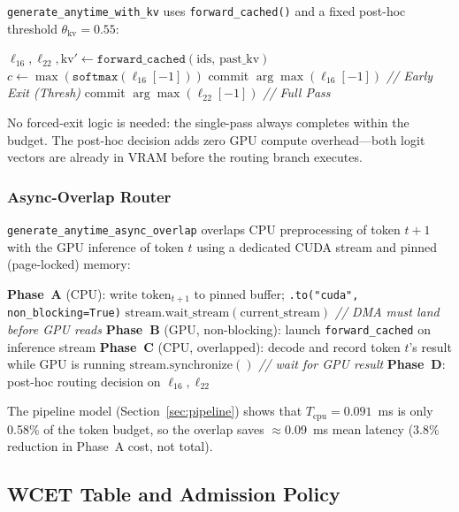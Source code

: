 \documentclass[conference]{IEEEtran}
\begin{document}
\texttt{generate\_anytime\_with\_kv} uses \texttt{forward\_cached()}
and a fixed post-hoc threshold $\theta_{\text{kv}}=0.55$:
\begin{algorithmic}[1]
\STATE $\ell_{16}, \ell_{22}, \text{kv}' \leftarrow
       \texttt{forward\_cached}(\text{ids},\, \text{past\_kv})$
\STATE $c \leftarrow \max(\texttt{softmax}(\ell_{16}[-1]))$
    \STATE commit $\arg\max(\ell_{16}[-1])$
           \hfill\textit{// Early Exit (Thresh)}
\ELSE
    \STATE commit $\arg\max(\ell_{22}[-1])$
           \hfill\textit{// Full Pass}
\ENDIF
\end{algorithmic}

No forced-exit logic is needed: the single-pass always completes
within the budget.
The post-hoc decision adds zero GPU compute overhead---both logit
vectors are already in VRAM before the routing branch executes.

\subsubsection{Async-Overlap Router}

\texttt{generate\_anytime\_async\_overlap} overlaps CPU preprocessing
of token $t{+}1$ with the GPU inference of token $t$ using a
dedicated CUDA stream and pinned (page-locked) memory:

\begin{algorithmic}[1]
\STATE \textbf{Phase~A} (CPU): write $\text{token}_{t+1}$ to
       pinned buffer; \texttt{.to("cuda", non\_blocking=True)}
\STATE $\text{stream.wait\_stream}(\text{current\_stream})$
       \hfill\textit{// DMA must land before GPU reads}
\STATE \textbf{Phase~B} (GPU, non-blocking): launch
       \texttt{forward\_cached} on inference stream
\STATE \textbf{Phase~C} (CPU, overlapped): decode and record
       token $t$'s result while GPU is running
\STATE $\text{stream.synchronize}()$
       \hfill\textit{// wait for GPU result}
\STATE \textbf{Phase~D}: post-hoc routing decision on $\ell_{16}, \ell_{22}$
\end{algorithmic}

The pipeline model (Section~\ref{sec:pipeline}) shows that
$T_{\text{cpu}} = 0.091$~ms is only 0.58\% of the token budget,
so the overlap saves $\approx$0.09~ms mean latency
(3.8\% reduction in Phase~A cost, not total).

\subsection{WCET Table and Admission Policy}
\end{document}
